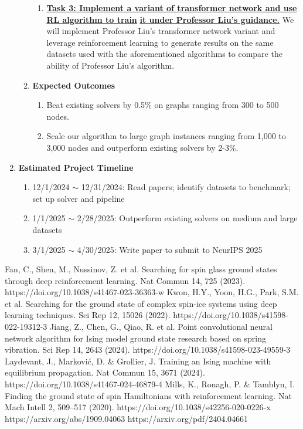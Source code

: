 \documentclass{article}
\begin{document}
\begin{enumerate}
\begin{enumerate}
\begin{enumerate}
		\item \textbf{\underline{Task 3: Implement a variant of transformer network and use RL algorithm to train}}
		\newline
		\textbf{\underline{it under Professor Liu's guidance.}} We will implement Professor Liu's transformer network variant and leverage reinforcement learning to generate results on the same datasets used with the aforementioned algorithms to compare the ability of Professor Liu's algorithm.

	\end{enumerate}

	\item \textbf{Expected Outcomes}
	
	\begin{enumerate}
		\item Beat existing solvers by 0.5\% on graphs ranging from 300 to 500 nodes.
		\item Scale our algorithm to large graph instances ranging from 1,000 to 3,000 nodes and outperform existing solvers by 2-3\%.
	\end{enumerate}

\end{enumerate}

\item \textbf{Estimated Project Timeline}
\begin{enumerate}
	\item 12/1/2024 $\sim$ 12/31/2024: Read papers; identify datasets to benchmark; set up solver and pipeline
	\item 1/1/2025 $\sim$ 2/28/2025: Outperform existing solvers on medium and large datasets
	\item 3/1/2025 $\sim$ 4/30/2025: Write paper to submit to NeurIPS 2025
\end{enumerate}

\end{enumerate}

\begin{thebibliography}{00}
Fan, C., Shen, M., Nussinov, Z. et al. Searching for spin glass ground states through deep reinforcement learning. Nat Commun 14, 725 (2023). https://doi.org/10.1038/s41467-023-36363-w
Kwon, H.Y., Yoon, H.G., Park, S.M. et al. Searching for the ground state of complex spin-ice systems using deep learning techniques. Sci Rep 12, 15026 (2022). https://doi.org/10.1038/s41598-022-19312-3
Jiang, Z., Chen, G., Qiao, R. et al. Point convolutional neural network algorithm for Ising model ground state research based on spring vibration. Sci Rep 14, 2643 (2024). https://doi.org/10.1038/s41598-023-49559-3
Laydevant, J., Marković, D. \& Grollier, J. Training an Ising machine with equilibrium propagation. Nat Commun 15, 3671 (2024). https://doi.org/10.1038/s41467-024-46879-4
Mills, K., Ronagh, P. \& Tamblyn, I. Finding the ground state of spin Hamiltonians with reinforcement learning. Nat Mach Intell 2, 509–517 (2020). https://doi.org/10.1038/s42256-020-0226-x
https://arxiv.org/abs/1909.04063
https://arxiv.org/pdf/2404.04661

\end{thebibliography}
\end{document}
